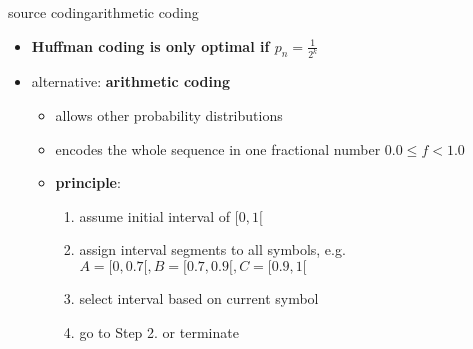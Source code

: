 	\begin{frame}{source coding}{arithmetic coding}
		\begin{itemize}
			\item	\textbf{Huffman coding is only optimal if $p_n = \frac{1}{2^k}$}
			\pause
            \bigskip
			\item	alternative: \textbf{arithmetic coding} 
                \begin{itemize}
                    \item   allows other probability distributions
                    \item   encodes the whole sequence in one fractional number $0.0 \leq f < 1.0$
                    \pause
                    \bigskip
                    \item   \textbf{principle}: 
                        \begin{enumerate}
                            \item   assume initial interval of $[0,1[$ 
                            \pause
                            \item   assign interval segments to all symbols, e.g. $A = [0,0.7[, B= [0.7,0.9[, C=[0.9,1[$
                            \pause
                            \item   select interval based on current symbol
                            \pause
                            \item	go to Step 2. or terminate
                        \end{enumerate}
                \end{itemize}
		\end{itemize}
	\end{frame}
	
